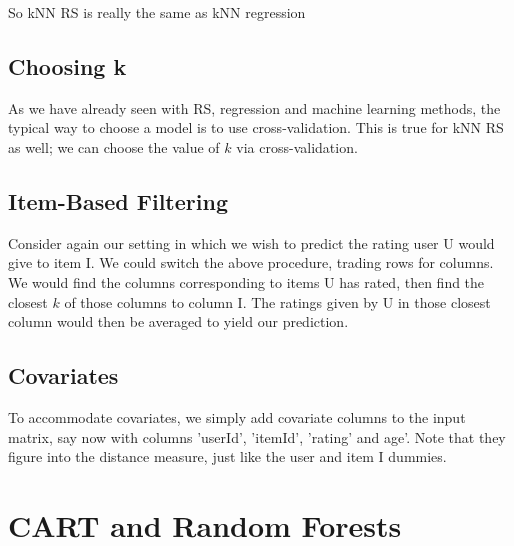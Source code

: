 So kNN RS is really the same as kNN regression

\subsection{Choosing k}

As we have already seen with RS, regression and machine learning methods, 
the typical way to choose a model is to use cross-validation.  This is
true for kNN RS as well; we can choose the value of $k$ via
cross-validation.  

% 
% 
% 

\subsection{Item-Based Filtering}

Consider again our setting in which we wish to predict the rating user U
would give to item I.  We could switch the above procedure, trading rows
for columns.  We would find the columns corresponding to items U has
rated, then find the closest $k$ of those columns to column I.  The
ratings given by U in those closest column would then be averaged to
yield our prediction.

\subsection{Covariates}

To accommodate covariates, we simply add covariate columns to the input
matrix, say now with columns 'userId', 'itemId', 'rating' and age'.
Note that they figure into the distance measure, just like the user and
item I dummies.

\section{CART and Random Forests}

